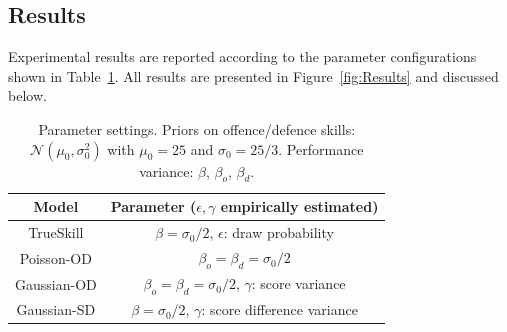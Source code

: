 \documentclass[runningheads,a4paper]{llncs}
\begin{document}
\subsection{Results}

\label{sec:results}

Experimental results are reported according to the parameter
configurations shown in Table~\ref{table:Parameters}. All results are
presented in Figure~\ref{fig:Results} and discussed below.
{\small\begin{table}[htbp!]
\vspace{-5mm}
\caption{Parameter settings. Priors on offence/defence skills: $\mathcal{N}(\mu_{0},\sigma_{0}^2)$ with $\mu_{0}=25$ and $\sigma_{0}=25/3$. Performance variance: $\beta$, $\beta_o$, $\beta_d$.}
\begin{center}
\small
\begin{tabular}{cc}
  \hline
  Model             & Parameter ($\epsilon,\gamma$ empirically estimated)\\
  \hline
  TrueSkill          & $\beta=\sigma_{0}/2$, $\epsilon$: draw probability\\
  Poisson-OD         & $\beta_o=\beta_d=\sigma_{0}/2$\\
  Gaussian-OD    & $\beta_o=\beta_d=\sigma_{0}/2$, $\gamma$: score variance\\
  Gaussian-SD & $\beta=\sigma_{0}/2$, $\gamma$: score difference variance\\
  \hline
\end{tabular}
\label{table:Parameters}
\end{center}
\vspace{-5mm}
\end{table}}
\end{document}
